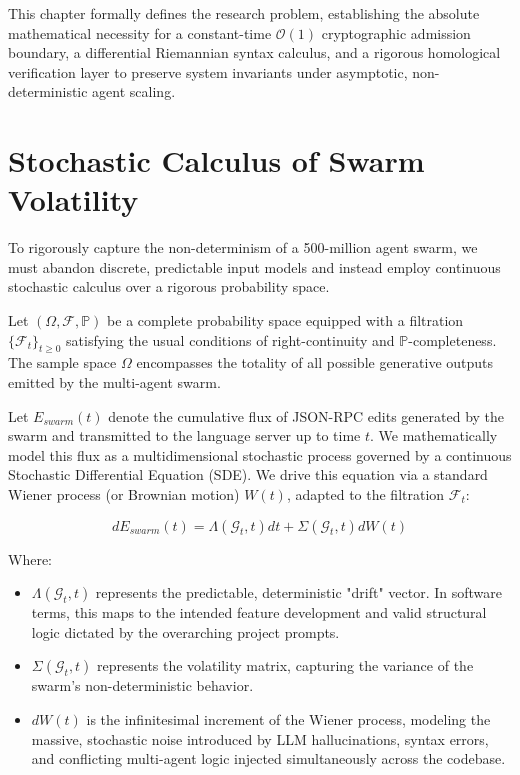 This chapter formally defines the research problem, establishing the absolute mathematical necessity for a constant-time $\mathcal{O}(1)$ cryptographic admission boundary, a differential Riemannian syntax calculus, and a rigorous homological verification layer to preserve system invariants under asymptotic, non-deterministic agent scaling.

\section{Stochastic Calculus of Swarm Volatility}

To rigorously capture the non-determinism of a 500-million agent swarm, we must abandon discrete, predictable input models and instead employ continuous stochastic calculus over a rigorous probability space. 

Let $(\Omega, \mathcal{F}, \mathbb{P})$ be a complete probability space equipped with a filtration $\{\mathcal{F}_t\}_{t \geq 0}$ satisfying the usual conditions of right-continuity and $\mathbb{P}$-completeness. The sample space $\Omega$ encompasses the totality of all possible generative outputs emitted by the multi-agent swarm.

Let $E_{swarm}(t)$ denote the cumulative flux of JSON-RPC edits generated by the swarm and transmitted to the language server up to time $t$. We mathematically model this flux as a multidimensional stochastic process governed by a continuous Stochastic Differential Equation (SDE). We drive this equation via a standard Wiener process (or Brownian motion) $W(t)$, adapted to the filtration $\mathcal{F}_t$:

\begin{equation}
dE_{swarm}(t) = \Lambda(\mathcal{G}_t, t) dt + \Sigma(\mathcal{G}_t, t) dW(t)
\end{equation}

Where:
\begin{itemize}
    \item $\Lambda(\mathcal{G}_t, t)$ represents the predictable, deterministic "drift" vector. In software terms, this maps to the intended feature development and valid structural logic dictated by the overarching project prompts.
    \item $\Sigma(\mathcal{G}_t, t)$ represents the volatility matrix, capturing the variance of the swarm's non-deterministic behavior.
    \item $dW(t)$ is the infinitesimal increment of the Wiener process, modeling the massive, stochastic noise introduced by LLM hallucinations, syntax errors, and conflicting multi-agent logic injected simultaneously across the codebase.
\end{itemize}

